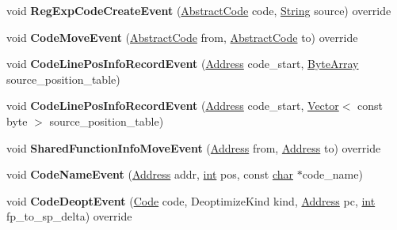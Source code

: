\begin{DoxyCompactItemize}
\mbox{\label{classv8_1_1internal_1_1Logger_ae50e9a1575661d16443a3a71388f38ab}} 
void {\bfseries Reg\+Exp\+Code\+Create\+Event} (\mbox{\hyperlink{classv8_1_1internal_1_1AbstractCode}{Abstract\+Code}} code, \mbox{\hyperlink{classv8_1_1internal_1_1String}{String}} source) override
\item 
\mbox{\label{classv8_1_1internal_1_1Logger_ab726061869e8d1e00871266258852368}} 
void {\bfseries Code\+Move\+Event} (\mbox{\hyperlink{classv8_1_1internal_1_1AbstractCode}{Abstract\+Code}} from, \mbox{\hyperlink{classv8_1_1internal_1_1AbstractCode}{Abstract\+Code}} to) override
\item 
\mbox{\label{classv8_1_1internal_1_1Logger_ac954023a65bf93a01fa6b811b43f27e6}} 
void {\bfseries Code\+Line\+Pos\+Info\+Record\+Event} (\mbox{\hyperlink{classuintptr__t}{Address}} code\+\_\+start, \mbox{\hyperlink{classv8_1_1internal_1_1ByteArray}{Byte\+Array}} source\+\_\+position\+\_\+table)
\item 
\mbox{\label{classv8_1_1internal_1_1Logger_af4c98845194394a4d02cb3e4ddb6724f}} 
void {\bfseries Code\+Line\+Pos\+Info\+Record\+Event} (\mbox{\hyperlink{classuintptr__t}{Address}} code\+\_\+start, \mbox{\hyperlink{classv8_1_1internal_1_1Vector}{Vector}}$<$ const byte $>$ source\+\_\+position\+\_\+table)
\item 
\mbox{\label{classv8_1_1internal_1_1Logger_a5a663130ec5a4e3839e77781983b3f44}} 
void {\bfseries Shared\+Function\+Info\+Move\+Event} (\mbox{\hyperlink{classuintptr__t}{Address}} from, \mbox{\hyperlink{classuintptr__t}{Address}} to) override
\item 
\mbox{\label{classv8_1_1internal_1_1Logger_a25ef7751705623af5cb5aedfa447efb1}} 
void {\bfseries Code\+Name\+Event} (\mbox{\hyperlink{classuintptr__t}{Address}} addr, \mbox{\hyperlink{classint}{int}} pos, const \mbox{\hyperlink{classchar}{char}} $\ast$code\+\_\+name)
\item 
\mbox{\label{classv8_1_1internal_1_1Logger_aee892412964305c929f3cd2cfd1d0e30}} 
void {\bfseries Code\+Deopt\+Event} (\mbox{\hyperlink{classv8_1_1internal_1_1Code}{Code}} code, Deoptimize\+Kind kind, \mbox{\hyperlink{classuintptr__t}{Address}} pc, \mbox{\hyperlink{classint}{int}} fp\+\_\+to\+\_\+sp\+\_\+delta) override

\end{DoxyCompactItemize}
